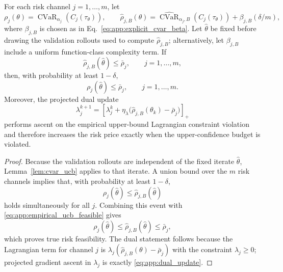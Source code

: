 \begin{theorem}
\label{thm:ucb_risk_constrained_learning}
For each risk channel $j=1,\dots,m$, let
\[
    \rho_j(\theta)
    =
    \operatorname{CVaR}_{\alpha_j}(C_j(\tau_\theta)),
    \qquad
    \widehat\rho_{j,B}(\theta)
    =
    \widehat{\operatorname{CVaR}}_{\alpha_j,B}(C_j(\tau_\theta))
    +
    \beta_{j,B}(\delta/m),
\]
where $\beta_{j,B}$ is chosen as in Eq.~\eqref{eq:app:explicit_cvar_beta}. Let
$\hat\theta$ be fixed before drawing the validation rollouts used to compute
$\widehat\rho_{j,B}$; alternatively, let $\beta_{j,B}$ include a uniform
function-class complexity term. If
\begin{equation}
    \widehat\rho_{j,B}(\hat\theta)\le \bar\rho_j,
    \qquad j=1,\dots,m,
    \label{eq:app:empirical_ucb_feasible}
\end{equation}
then, with probability at least $1-\delta$,
\begin{equation}
    \rho_j(\hat\theta)
    \le
    \bar\rho_j,
    \qquad j=1,\dots,m .
    \label{eq:app:true_risk_feasible}
\end{equation}
Moreover, the projected dual update
\begin{equation}
    \lambda_j^{k+1}
    =
    \left[
    \lambda_j^k
    +
    \eta_\lambda
    \bigl(\widehat\rho_{j,B}(\theta_k)-\bar\rho_j\bigr)
    \right]_+
    \label{eq:app:dual_update}
\end{equation}
performs ascent on the empirical upper-bound Lagrangian constraint violation and
therefore increases the risk price exactly when the upper-confidence budget is
violated.
\end{theorem}

\begin{proof}
Because the validation rollouts are independent of the fixed iterate $\hat\theta$,
Lemma~\ref{lem:cvar_ucb} applies to that iterate. A union bound over the $m$ risk
channels implies that, with probability at least $1-\delta$,
\[
    \rho_j(\hat\theta)
    \le
    \widehat\rho_{j,B}(\hat\theta)
\]
holds simultaneously for all $j$. Combining this event with
\eqref{eq:app:empirical_ucb_feasible} gives
\[
    \rho_j(\hat\theta)
    \le
    \widehat\rho_{j,B}(\hat\theta)
    \le
    \bar\rho_j,
\]
which proves true risk feasibility. The dual statement follows because the Lagrangian
term for channel $j$ is
$\lambda_j(\widehat\rho_{j,B}(\theta)-\bar\rho_j)$ with the constraint
$\lambda_j\ge 0$; projected gradient ascent in $\lambda_j$ is exactly
\eqref{eq:app:dual_update}.
\end{proof}

